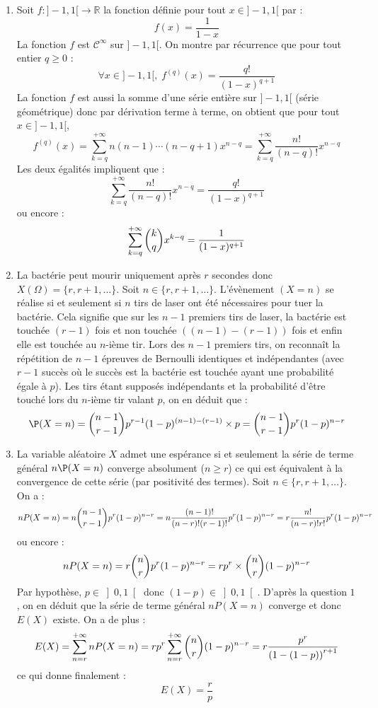 \documentclass[a4paper,twoside,french,11pt]{VcCours}
\begin{document}
\begin{enumerate}
\item Soit $f : ]-1,1[ \rightarrow \mathbb{R}$ la fonction définie pour tout $x \in ]-1,1[$ par :
$$ f(x) = \dfrac{1}{1-x}$$
La fonction $f$ est $\mathcal{C}^{\infty}$ sur $]-1,1[$. On montre par récurrence que pour tout entier $q \geq 0$ :
$$ \forall x \in ]-1,1[, \; f^{(q)}(x) = \dfrac{q!}{(1-x)^{q+1}}$$
La fonction $f$ est aussi la somme d'une série entière sur $]-1,1[$ (série géométrique) donc par dérivation terme à terme, on obtient que pour tout $x \in ]-1,1[$,
$$ f^{(q)}(x) = \sum_{k=q}^{+ \infty} n(n-1) \cdots (n-q+1) x^{n-q} = \sum_{k=q}^{+ \infty} \dfrac{n!}{(n-q)!} x^{n-q}$$
Les deux égalités impliquent que :
$$ \sum_{k=q}^{+ \infty} \dfrac{n!}{(n-q)!} x^{n-q} = \dfrac{q!}{(1-x)^{q+1}}$$
ou encore :
$$ \sum\limits_{k=q}^{+\infty}\dbinom{k}{q}x^{k-q}=\dfrac{1}{(1-x)^{q+1}}$$
\item La bactérie peut mourir uniquement après $r$ secondes donc $X(\Omega)=\lbrace r, r+1, \ldots \rbrace$. Soit $n\in \lbrace r, r+1, \ldots \rbrace$. L'évènement $(X=n)$ se réalise si et seulement si $n$ tirs de laser ont été nécessaires pour tuer la bactérie. Cela signifie que sur les $n-1$ premiers tirs de laser, la bactérie est  touchée $(r-1)$ fois et non touchée  $\left( (n-1)-(r-1)\right)$ fois et enfin elle est touchée au $n$-ième tir. Lors des $n-1$ premiers tirs, on reconnaît la répétition de $n-1$ épreuves de Bernoulli identiques et indépendantes (avec $r-1$ succès où le succès est \og la bactérie est touchée \fg ayant une probabilité égale à $p$). Les tirs étant supposés indépendants et la probabilité d'être touché lors du $n$-ième tir valant $p$, on en déduit que :
$$\P(X=n)=\dbinom{n-1}{r-1}p^{r-1}(1-p)^{(n-1)-(r-1)}\times p = \dbinom{n-1}{r-1}p^{r}(1-p)^{n-r}$$
\item La variable aléatoire $X$ admet une espérance si et seulement la série de terme général $n \P(X=n)$ converge absolument ($n \geq r$) ce qui est équivalent à la convergence de cette série (par positivité des termes). Soit $n\in \lbrace r, r+1, \ldots \rbrace$. On a :
$$nP(X=n)=n\dbinom{n-1}{r-1}p^{r}(1-p)^{n-r}=n\dfrac{(n-1)!}{(n-r)!(r-1)!}p^{r}(1-p)^{n-r}=r\dfrac{n!}{(n-r)!r!}p^{r}(1-p)^{n-r}$$
ou encore :
$$nP(X=n)=r \dbinom{n}{r}p^{r}(1-p)^{n-r} = rp^r \times \dbinom{n}{r} (1-p)^{n-r}$$
Par hypothèse, $p\in \left]0,1 \right[$ donc $(1-p)\in \left]0,1 \right[$. D'après la question $1$, on en déduit que la série de terme général $nP(X=n)$ converge et donc $E(X)$ existe. On a de plus :
$$E(X)=\sum\limits_{n= r}^{+\infty} nP(X=n)=r p^r\sum\limits_{n= r}^{+\infty}\dbinom{n}{r}(1-p)^{n-r}
=r \dfrac{p^r}{\left( 1-(1-p)\right)^{r+1} } $$
ce qui donne finalement :
$$E(X)=\dfrac{r}{p}$$
\end{enumerate}
\end{document}
